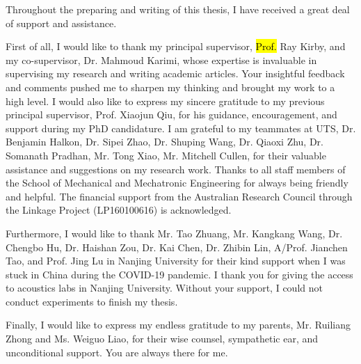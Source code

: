 \documentclass[
    11pt, %
    english, %
    onehalfspacing, %
    headsepline, %
]{MastersDoctoralThesis} %
\newcommand{\revA}[1]{\hl{#1}}
\begin{document}
\begin{acknowledgements}
\addchaptertocentry{\acknowledgementname} %

\noindent Throughout the preparing and writing of this thesis, I have received a great deal of support and assistance. 

First of all, I would like to thank my principal supervisor, \revA{Prof.} Ray Kirby, and my co-supervisor, Dr. Mahmoud Karimi, whose expertise is invaluable in supervising my research and writing academic articles.
Your insightful feedback and comments pushed me to sharpen my thinking and brought my work to a high level.
I would also like to express my sincere gratitude to my previous principal supervisor, Prof. Xiaojun Qiu, for his guidance, encouragement, and support during my PhD candidature. 
I am grateful to my teammates at UTS, Dr. Benjamin Halkon, Dr. Sipei Zhao, Dr. Shuping Wang, Dr. Qiaoxi Zhu, Dr. Somanath Pradhan, Mr. Tong Xiao, Mr. Mitchell Cullen, for their valuable assistance and suggestions on my research work.
Thanks to all staff members of the School of Mechanical and Mechatronic Engineering for always being friendly and helpful.
The financial support from the Australian Research Council through the Linkage Project (LP160100616) is acknowledged. 

Furthermore, I would like to thank Mr. Tao Zhuang, Mr. Kangkang Wang, Dr. Chengbo Hu, Dr. Haishan Zou, Dr. Kai Chen, Dr. Zhibin Lin, A/Prof. Jianchen Tao, and Prof. Jing Lu in Nanjing University for their kind support when I was stuck in China during the COVID-19 pandemic.
I thank you for giving the access to acoustics labs in Nanjing University.
Without your support, I could not conduct experiments to finish my thesis.

Finally, I would like to express my endless gratitude to my parents, Mr. Ruiliang Zhong and Ms. Weiguo Liao, for their wise counsel, sympathetic ear, and unconditional support.
You are always there for me.



\end{acknowledgements}
\end{document}
